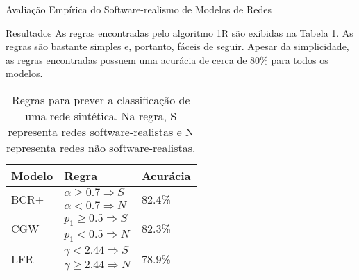 \begin{section}{Avaliação Empírica do Software-realismo de Modelos de Redes}
\begin{subsection}{Resultados}
As regras encontradas pelo algoritmo 1R são exibidas na Tabela \ref{tab:rules}. As regras são bastante simples e, portanto, fáceis de seguir. Apesar da simplicidade, as regras encontradas possuem uma acurácia de cerca de 80\% para todos os modelos.

\begin{table}
\caption{Regras para prever a classificação de uma rede sintética. Na regra, S representa redes software-realistas e N representa redes não software-realistas.}
\centering
\begin{tabular}{|l|l|l|}
\hline
Modelo & Regra & Acurácia \\
\hline 
\hline
\multirow{2}{*}{BCR+}
     & $\alpha \ge 0.7 \Rightarrow S$ & \multirow{2}{*}{82.4\%}  \\ 
     & $\alpha < 0.7 \Rightarrow N$ & \\ 
\hline
\multirow{2}{*}{CGW}
     & $p_1 \ge 0.5 \Rightarrow S$ & \multirow{2}{*}{82.3\%} \\  
     & $p_1 < 0.5 \Rightarrow N$ & \\  
\hline
\multirow{2}{*}{LFR}   
     & $\gamma < 2.44 \Rightarrow S$ & \multirow{2}{*}{78.9\%} \\ 
     & $\gamma \ge 2.44 \Rightarrow N$ & \\ 
\hline
\end{tabular}
\label{tab:rules}
\end{table}

\end{subsection}

\end{section}


 
% 
% 
% 
% 
% 
% 
% 
% 
% 
